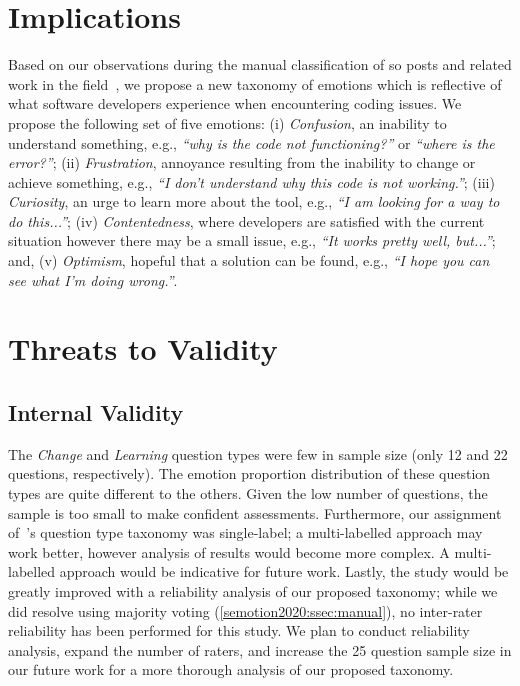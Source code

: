 \section{Implications}\label{semotion2020:sec:implications}

Based on our observations during the manual classification of \gls{so} posts and related work in the field~\citep{wrobel2013}, we propose a new taxonomy of emotions which is reflective of what software developers experience when encountering coding issues. We propose the following set of five emotions: 
(i) \textit{Confusion}, an inability to understand something, e.g., \textit{``why is the code not functioning?''} or \textit{``where is the error?''};
(ii) \textit{Frustration}, annoyance resulting from the inability to change or achieve something, e.g., \textit{``I don't understand why this code is not working.''};
(iii) \textit{Curiosity}, an urge to learn more about the tool, e.g., \textit{``I am looking for a way to do this...''};
(iv) \textit{Contentedness}, where developers are satisfied with the current situation however there may be a small issue, e.g., \textit{``It works pretty well, but...''}; and,
(v) \textit{Optimism}, hopeful that a solution can be found, e.g., \textit{``I hope you can see what I'm doing wrong.''}.


\section{Threats to Validity}\label{semotion2020:sec:threats}

\subsection{Internal Validity} 
The \textit{ Change} and \textit{Learning} question types were few in sample size (only 12 and 22 questions, respectively). The emotion  proportion distribution of these question types are  quite different to the others.  Given the low number of questions, the sample is too small to make confident assessments. Furthermore, our assignment of~\citeauthor{Beyer:2018fm}'s question type taxonomy was single-label; a multi-labelled approach may work better, however analysis of results would become more complex. A multi-labelled approach would be indicative for future work. Lastly, the study would be greatly improved with a reliability analysis of our proposed taxonomy; while we did resolve using majority voting (\cref{semotion2020:ssec:manual}), no inter-rater reliability has been performed for this study. We plan to conduct reliability analysis, expand the number of raters, and increase the 25 question sample size in our future work for a more thorough analysis of our proposed taxonomy. 

